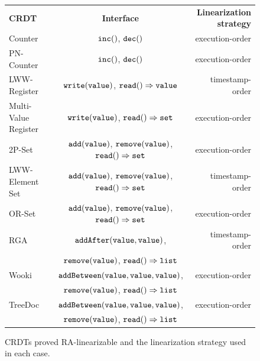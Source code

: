 \begin{figure}[t]
{\footnotesize
\begin{tabular}{|l|c|r|}
\hline
{\bf CRDT} & {\bf Interface} & {\bf Linearization strategy}\\
\hhline{|===|}
Counter~\cite{ShapiroPBZ11}&$\alabelshort[{\tt inc}]{}$, $\alabelshort[{\tt dec}]{}$ & execution-order \\
\hline
PN-Counter~\cite{ShapiroPBZ11}&$\alabelshort[{\tt inc}]{}$, $\alabelshort[{\tt dec}]{}$ & execution-order \\
\hline
LWW-Register~\cite{DBLP:journals/rfc/rfc677}&$\alabelshort[{\tt write}]{value}$, $\alabellong[{\tt read}]{}{value}{}$ & timestamp-order\\
\hline
Multi-Value Register~\cite{DBLP:conf/sosp/DeCandiaHJKLPSVV07}&$\alabelshort[{\tt write}]{value}$, $\alabellong[{\tt read}]{}{set}{}$ & execution-order\\
\hline
2P-Set~\cite{ShapiroPBZ11}&$\alabelshort[{\tt add}]{value}$, $\alabelshort[{\tt remove}]{value}$, $\alabellong[{\tt read}]{}{set}{}$ & execution-order\\
\hline
LWW-Element Set~\cite{ShapiroPBZ11}&$\alabelshort[{\tt add}]{value}$, $\alabelshort[{\tt remove}]{value}$, $\alabellong[{\tt read}]{}{set}{}$ & timestamp-order\\
\hline
OR-Set~\cite{ShapiroPBZ11}&$\alabelshort[{\tt add}]{value}$, $\alabelshort[{\tt remove}]{value}$, $\alabellong[{\tt read}]{}{set}{}$ & execution-order\\
\hline
RGA~\cite{RohJKL11}&$\alabelshort[{\tt addAfter}]{value,value}$, & timestamp-order
                \\ & $\alabelshort[{\tt remove}]{value}$, $\alabellong[{\tt read}]{}{list}{}$ & \\
\hline
Wooki~\cite{DBLP:conf/wise/WeissUM07}&$\alabelshort[{\tt addBetween}]{value,value,value}$, & execution-order
                \\ & $\alabelshort[{\tt remove}]{value}$, $\alabellong[{\tt read}]{}{list}{}$ & \\
\hline
TreeDoc~\cite{DBLP:conf/icdcs/PreguicaMSL09}&$\alabelshort[{\tt addBetween}]{value,value,value}$, & execution-order
                \\ & $\alabelshort[{\tt remove}]{value}$, $\alabellong[{\tt read}]{}{list}{}$ & \\
\hline
\end{tabular}
}
\vspace{-2mm}
\caption{CRDTs proved RA-linearizable and the linearization strategy used in each case.}
\label{fig:crdt-implementaton of this paper, their correctness, and their interface}
 \vspace{-4mm}
\end{figure}

